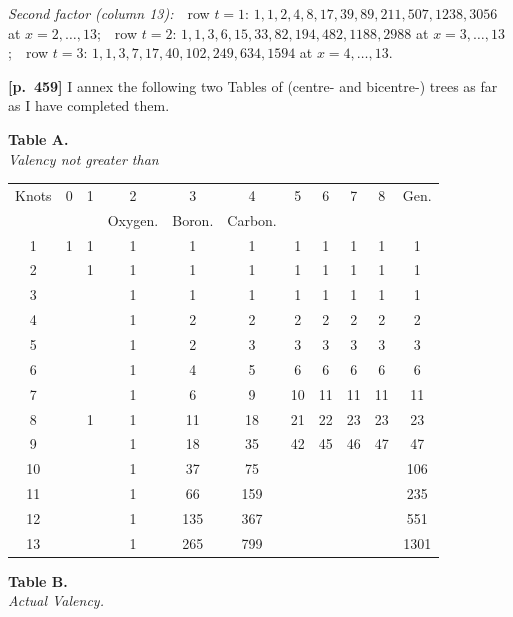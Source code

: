 \documentclass[11pt,a4paper]{article}
\begin{document}
\noindent\textit{Second factor (column 13):}\ \ row $t=1$: $1,1,2,4,8,17,39,89,211,507,1238,3056$ at $x=2,\ldots,13$;\ \ row $t=2$: $1,1,3,6,15,33,82,194,482,1188,2988$ at $x=3,\ldots,13$;\ \ row $t=3$: $1,1,3,7,17,40,102,249,634,1594$ at $x=4,\ldots,13$.

\bigskip
\noindent\textbf{[p.~459]}\quad
I annex the following two Tables of (centre- and bicentre-) trees as far as I have completed them.

\medskip
\begin{center}
\textbf{Table A.}\\
\textit{Valency not greater than}
\end{center}

\begin{center}
\renewcommand{\arraystretch}{1.1}
\begin{tabular}{c|ccccccccc|c}
\hline
Knots & 0 & 1 & 2 & 3 & 4 & 5 & 6 & 7 & 8 & Gen. \\
 & & & Oxygen. & Boron. & Carbon. & & & & & \\
\hline
1  & 1 & 1 & 1 & 1 & 1 & 1 & 1 & 1 & 1 & 1 \\
2  &   & 1 & 1 & 1 & 1 & 1 & 1 & 1 & 1 & 1 \\
3  &   &   & 1 & 1 & 1 & 1 & 1 & 1 & 1 & 1 \\
4  &   &   & 1 & 2 & 2 & 2 & 2 & 2 & 2 & 2 \\
5  &   &   & 1 & 2 & 3 & 3 & 3 & 3 & 3 & 3 \\
6  &   &   & 1 & 4 & 5 & 6 & 6 & 6 & 6 & 6 \\
7  &   &   & 1 & 6 & 9 & 10 & 11 & 11 & 11 & 11 \\
8  &   & 1 & 1 & 11 & 18 & 21 & 22 & 23 & 23 & 23 \\
9  &   &   & 1 & 18 & 35 & 42 & 45 & 46 & 47 & 47 \\
10 &   &   & 1 & 37 & 75 &   &   &   &   & 106 \\
11 &   &   & 1 & 66 & 159 &   &   &   &   & 235 \\
12 &   &   & 1 & 135 & 367 &   &   &   &   & 551 \\
13 &   &   & 1 & 265 & 799 &   &   &   &   & 1301 \\
\hline
\end{tabular}
\end{center}

\medskip
\begin{center}
\textbf{Table B.}\\
\textit{Actual Valency.}
\end{center}
\end{document}
